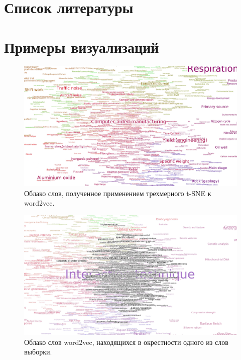 \chapter{Список литературы}



\chapter{Примеры визуализаций}

\begin{figure}[h]
  \centering
  \includegraphics[width=\textwidth]{shots/cloud.png}
  \caption{Облако слов, полученное применением трехмерного t-SNE к word2vec.}
\end{figure}

\begin{figure}[h]
  \centering
  \includegraphics[width=\textwidth]{shots/local.png}
  \caption{Облако слов word2vec, находящихся в окрестности одного из слов выборки.}
\end{figure}


